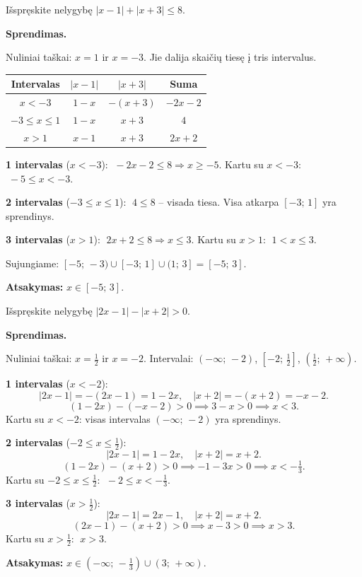 \begin{example}
Išspręskite nelygybę $|x - 1| + |x + 3| \leq 8$.

\textbf{Sprendimas.}

Nuliniai taškai: $x = 1$ ir $x = -3$. Jie dalija skaičių tiesę į tris intervalus.

\begin{center}
\begin{tabular}{|c|c|c|c|}
\hline
\textbf{Intervalas} & $|x-1|$ & $|x+3|$ & \textbf{Suma} \\
\hline
$x < -3$ & $1-x$ & $-(x+3)$ & $-2x-2$ \\
$-3 \leq x \leq 1$ & $1-x$ & $x+3$ & $4$ \\
$x > 1$ & $x-1$ & $x+3$ & $2x+2$ \\
\hline
\end{tabular}
\end{center}

\textbf{1 intervalas} ($x < -3$): $\;-2x - 2 \leq 8 \Rightarrow x \geq -5$. Kartu su $x < -3$: $\;-5 \leq x < -3$.

\textbf{2 intervalas} ($-3 \leq x \leq 1$): $\;4 \leq 8$ – visada tiesa. Visa atkarpa $[-3;\,1]$ yra sprendinys.

\textbf{3 intervalas} ($x > 1$): $\;2x + 2 \leq 8 \Rightarrow x \leq 3$. Kartu su $x > 1$: $\;1 < x \leq 3$.

Sujungiame: $[-5;\,-3) \cup [-3;\,1] \cup (1;\,3] = [-5;\,3]$.

\textbf{Atsakymas:} $x \in [-5;\, 3]$.
\end{example}

\begin{example}
Išspręskite nelygybę $|2x - 1| - |x + 2| > 0$.

\textbf{Sprendimas.}

Nuliniai taškai: $x = \tfrac{1}{2}$ ir $x = -2$. Intervalai: $\left(-\infty;\,-2\right)$, $\left[-2;\,\tfrac{1}{2}\right]$, $\left(\tfrac{1}{2};\,+\infty\right)$.

\textbf{1 intervalas} ($x < -2$):
\[
|2x-1| = -(2x-1) = 1-2x, \quad |x+2| = -(x+2) = -x-2.
\]
\[
(1-2x) - (-x-2) > 0 \implies 3 - x > 0 \implies x < 3.
\]
Kartu su $x < -2$: visas intervalas $(-\infty;\,-2)$ yra sprendinys.

\textbf{2 intervalas} ($-2 \leq x \leq \tfrac{1}{2}$):
\[
|2x-1| = 1-2x, \quad |x+2| = x+2.
\]
\[
(1-2x)-(x+2) > 0 \implies -1-3x > 0 \implies x < -\tfrac{1}{3}.
\]
Kartu su $-2 \leq x \leq \tfrac{1}{2}$: $\;-2 \leq x < -\tfrac{1}{3}$.

\textbf{3 intervalas} ($x > \tfrac{1}{2}$):
\[
|2x-1| = 2x-1, \quad |x+2| = x+2.
\]
\[
(2x-1)-(x+2) > 0 \implies x - 3 > 0 \implies x > 3.
\]
Kartu su $x > \tfrac{1}{2}$: $\;x > 3$.

\textbf{Atsakymas:} $x \in (-\infty;\,-\tfrac{1}{3}) \cup (3;\,+\infty)$.
\end{example}

